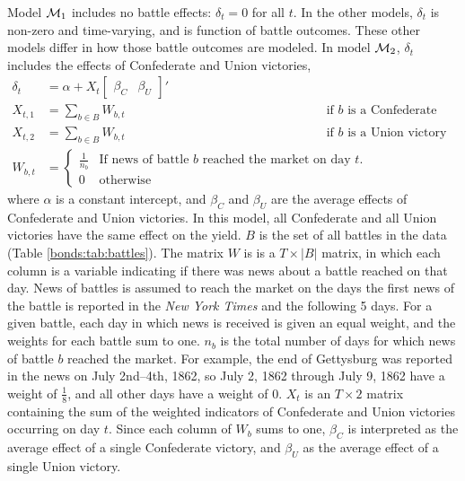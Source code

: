 Model $\mathcal{M}_{\text{1}}$ includes no battle effects: $\delta_{t} = 0$ for all $t$.
In the other models, $\delta_{t}$ is non-zero and time-varying, and is function of battle outcomes.
These other models differ in how those battle outcomes are modeled.
In model $\mathcal{M}_{\text{2}}$, $\delta_{t}$ includes the effects of Confederate and Union victories,
\begin{align}
  \label{bonds:eq:2}
  \delta_{t} &= \alpha + X_{t} \begin{bmatrix}\beta_{C} & \beta_{U}\end{bmatrix}'  \\
  X_{t, 1} &= \sum_{b \in B} W_{b,t} && \text{if $b$ is a Confederate victory} \\
  X_{t, 2} &= \sum_{b \in B} W_{b,t} && \text{if $b$ is a Union victory} \\
  W_{b,t} &= 
            \begin{cases}
              \frac{1}{n_{b}} & \text{If news of battle $b$ reached the market on day $t$.} \\
              0 & \text{otherwise}
            \end{cases}
\end{align}
where $\alpha$ is a constant intercept, and $\beta_{C}$ and $\beta_{U}$ are the average effects of Confederate and Union victories.
In this model, all Confederate and all Union victories have the same effect on the yield.
$B$ is the set of all battles in the data (Table \ref{bonds:tab:battles}).
The matrix $W$ is is a $T \times |B|$ matrix, in which each column is a variable indicating if there was news about a battle reached on that day.
News of battles is assumed to reach the market on the days the first news of the battle is reported in the \textit{New York Times} and the following 5 days.
For a given battle, each day in which news is received is given an equal weight, and the weights for each battle sum to one.
$n_{b}$ is the total number of days for which news of battle $b$ reached the market.
For example, the end of Gettysburg was reported in the news on July 2nd--4th, 1862, so July 2, 1862 through July 9, 1862 have a weight of $\frac{1}{8}$, and all other days have a weight of 0.
$X_{t}$ is an $T \times 2$ matrix containing the sum of the weighted indicators of Confederate and Union victories occurring on day $t$. 
Since each column of $W_{b}$ sums to one, $\beta_{C}$ is interpreted as the average effect of a single Confederate victory, and $\beta_{U}$ as the average effect of a single Union victory.

